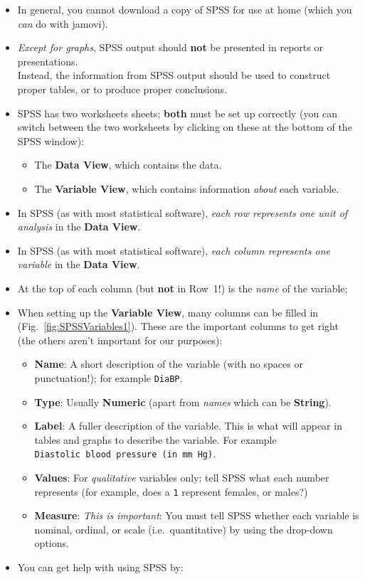 \documentclass[
  11pt,
  a4paper,
]{krantz}
\providecommand{\tightlist}{%
  \setlength{\itemsep}{0pt}\setlength{\parskip}{0pt}}
\begin{document}
\begin{itemize}
\tightlist
\item
  In general, you cannot download a copy of SPSS for use at home (which you \emph{can} do with jamovi).
\item
  \emph{Except for graphs}, SPSS output should \textbf{not} be presented in reports or presentations.\\
  Instead, the information from SPSS output should be used to construct proper tables, or to produce proper conclusions.
\item
  SPSS has two worksheets sheets; \textbf{both} must be set up correctly (you can switch between the two worksheets by clicking on these at the bottom of the SPSS window):

  \begin{itemize}
  \tightlist
  \item
    The \textbf{Data View}, which contains the data.
  \item
    The \textbf{Variable View}, which contains information \emph{about} each variable.
  \end{itemize}
\item
  In SPSS (as with most statistical software), \emph{each row represents one unit of analysis} in the \textbf{Data View}.
\item
  In SPSS (as with most statistical software), \emph{each column represents one variable} in the \textbf{Data View}.
\item
  At the top of each column (but \textbf{not} in Row~1!) is the \emph{name} of the variable;
\item
  When setting up the \textbf{Variable View}, many columns can be filled in (Fig.~\ref{fig:SPSSVariables1}).
  These are the important columns to get right (the others aren't important for our purposes):

  \begin{itemize}
  \tightlist
  \item
    \textbf{Name}: A short description of the variable (with no spaces or punctuation!); for example \texttt{DiaBP}.
  \item
    \textbf{Type}: Usually \textbf{Numeric} (apart from \emph{names} which can be \textbf{String}).
  \item
    \textbf{Label}: A fuller description of the variable. This is what will appear in tables and graphs to describe the variable.
    For example \texttt{Diastolic\ blood\ pressure\ (in\ mm\ Hg)}.
  \item
    \textbf{Values}: For \emph{qualitative} variables only: tell SPSS what each number represents (for example, does a \texttt{1} represent females, or males?)
  \item
    \textbf{Measure}: \emph{This is important}:
    You must tell SPSS whether each variable is nominal, ordinal, or scale (i.e.~quantitative) by using the drop-down options.
  \end{itemize}
\item
  You can get help with using SPSS by:


\end{itemize}
\end{document}
